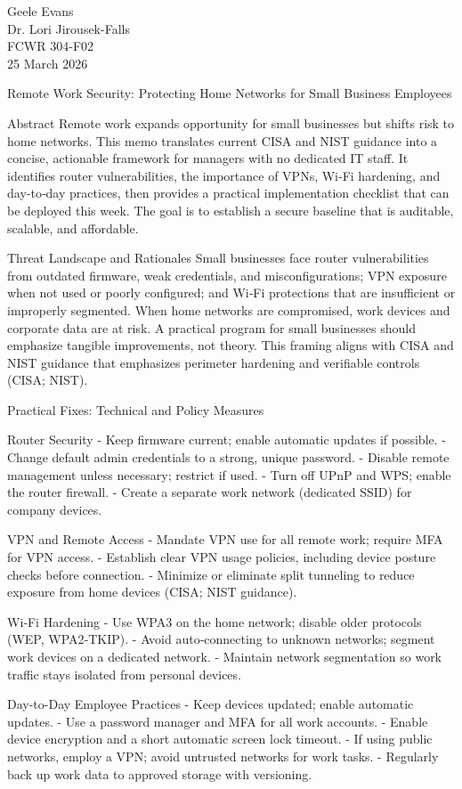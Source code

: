 \documentclass[12pt]{article}
\begin{document}
Geele Evans\\
Dr. Lori Jirousek-Falls\\
FCWR 304-F02\\
25 March 2026

Remote Work Security: Protecting Home Networks for Small Business Employees

Abstract
Remote work expands opportunity for small businesses but shifts risk to home networks. This memo translates current CISA and NIST guidance into a concise, actionable framework for managers with no dedicated IT staff. It identifies router vulnerabilities, the importance of VPNs, Wi‑Fi hardening, and day‑to‑day practices, then provides a practical implementation checklist that can be deployed this week. The goal is to establish a secure baseline that is auditable, scalable, and affordable.

Threat Landscape and Rationales
Small businesses face router vulnerabilities from outdated firmware, weak credentials, and misconfigurations; VPN exposure when not used or poorly configured; and Wi‑Fi protections that are insufficient or improperly segmented. When home networks are compromised, work devices and corporate data are at risk. A practical program for small businesses should emphasize tangible improvements, not theory. This framing aligns with CISA and NIST guidance that emphasizes perimeter hardening and verifiable controls (CISA; NIST).

Practical Fixes: Technical and Policy Measures

Router Security
- Keep firmware current; enable automatic updates if possible.
- Change default admin credentials to a strong, unique password.
- Disable remote management unless necessary; restrict if used.
- Turn off UPnP and WPS; enable the router firewall.
- Create a separate work network (dedicated SSID) for company devices.

VPN and Remote Access
- Mandate VPN use for all remote work; require MFA for VPN access.
- Establish clear VPN usage policies, including device posture checks before connection.
- Minimize or eliminate split tunneling to reduce exposure from home devices (CISA; NIST guidance).

Wi‑Fi Hardening
- Use WPA3 on the home network; disable older protocols (WEP, WPA2‑TKIP).
- Avoid auto‑connecting to unknown networks; segment work devices on a dedicated network.
- Maintain network segmentation so work traffic stays isolated from personal devices.

Day-to-Day Employee Practices
- Keep devices updated; enable automatic updates.
- Use a password manager and MFA for all work accounts.
- Enable device encryption and a short automatic screen lock timeout.
- If using public networks, employ a VPN; avoid untrusted networks for work tasks.
- Regularly back up work data to approved storage with versioning.
\end{document}

